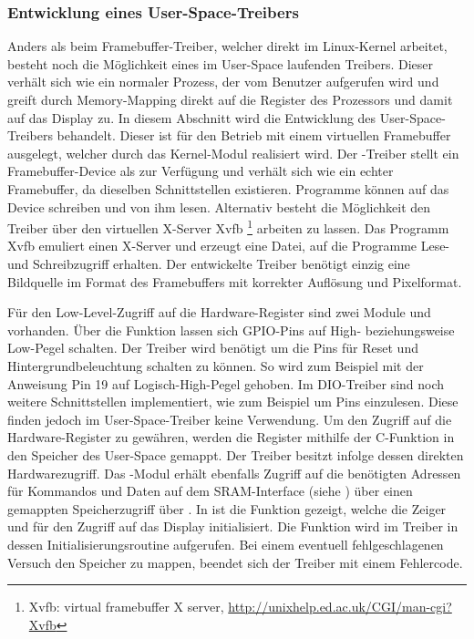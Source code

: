\subsubsection{Entwicklung eines User-Space-Treibers}
\label{cha:userspace}
Anders als beim Framebuffer-Treiber, welcher direkt im Linux-Kernel arbeitet, besteht noch die Möglichkeit eines im User-Space laufenden Treibers. Dieser verhält sich wie ein normaler Prozess, der vom Benutzer aufgerufen wird und greift durch Memory-Mapping direkt auf die Register des Prozessors und damit auf das Display zu.
In diesem Abschnitt wird die Entwicklung des User-Space-Treibers behandelt. 
Dieser ist für den Betrieb mit einem virtuellen Framebuffer ausgelegt, welcher durch das Kernel-Modul  realisiert wird. Der -Treiber stellt ein Framebuffer-Device als  zur Verfügung und verhält sich wie ein echter Framebuffer, da dieselben Schnittstellen existieren. Programme können auf das Device schreiben und von ihm lesen. Alternativ besteht die Möglichkeit den Treiber über den virtuellen X-Server Xvfb \footnote{Xvfb: virtual framebuffer X server, \url{http://unixhelp.ed.ac.uk/CGI/man-cgi?Xvfb}} arbeiten zu lassen. Das Programm Xvfb emuliert einen X-Server und erzeugt eine Datei, auf die Programme Lese- und Schreibzugriff erhalten. Der entwickelte Treiber benötigt einzig eine Bildquelle im Format des Framebuffers mit korrekter Auflösung und Pixelformat. 

Für den Low-Level-Zugriff auf die Hardware-Register sind zwei Module  und  vorhanden. Über die Funktion  lassen sich GPIO-Pins auf \linebreak High- beziehungsweise Low-Pegel schalten. Der Treiber wird benötigt um die Pins für Reset und Hintergrundbeleuchtung schalten zu können. So wird zum Beispiel mit der Anweisung  Pin 19 auf Logisch-High-Pegel gehoben.
Im DIO-Treiber sind noch weitere Schnittstellen implementiert, wie zum Beispiel  um Pins einzulesen. Diese finden jedoch im User-Space-Treiber keine Verwendung. Um den Zugriff auf die Hardware-Register zu gewähren, werden die Register mithilfe der C-Funktion  in den Speicher des User-Space gemappt. Der Treiber besitzt infolge dessen direkten Hardwarezugriff.
Das -Modul erhält ebenfalls Zugriff auf die benötigten Adressen für Kommandos und Daten auf dem SRAM-Interface (siehe ) über einen gemappten Speicherzugriff über . In  ist die Funktion  gezeigt, welche die Zeiger  und  für den Zugriff auf das Display initialisiert. Die Funktion wird im Treiber in dessen Initialisierungsroutine aufgerufen. Bei einem eventuell fehlgeschlagenen Versuch den Speicher zu mappen, beendet sich der Treiber mit einem Fehlercode.


